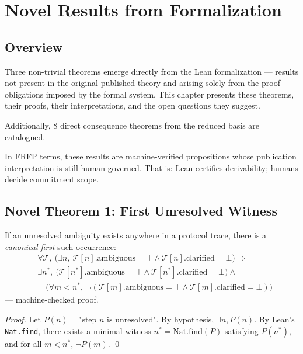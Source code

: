 \section{Novel Results from Formalization}
\label{ch:results}

\subsection{Overview}

Three non-trivial theorems emerge directly from the Lean formalization --- results
not present in the original published theory and arising solely from the proof
obligations imposed by the formal system. This chapter presents these theorems,
their proofs, their interpretations, and the open questions they suggest.

Additionally, 8 direct consequence theorems from the reduced basis are catalogued.

In FRFP terms, these results are machine-verified propositions whose publication
interpretation is still human-governed. That is: Lean certifies derivability;
humans decide commitment scope.

\subsection{Novel Theorem 1: First Unresolved Witness}

\begin{theorem}
If an unresolved ambiguity exists anywhere in a protocol trace, there is a
\emph{canonical first} such occurrence:
\begin{align*}
  &\forall \mathcal{T},\
  \Big(\exists n,\
  \mathcal{T}[n].\mathrm{ambiguous} = \top
  \wedge \mathcal{T}[n].\mathrm{clarified} = \bot\Big)
  \Rightarrow \\
  &\exists n^*,\
  \Big(\mathcal{T}[n^*].\mathrm{ambiguous} = \top
  \wedge \mathcal{T}[n^*].\mathrm{clarified} = \bot\Big)
  \wedge \\
  &\quad \Big(\forall m < n^*,\
  \neg(\mathcal{T}[m].\mathrm{ambiguous} = \top
      \wedge \mathcal{T}[m].\mathrm{clarified} = \bot)\Big)
\end{align*}
--- machine-checked proof.
\end{theorem}
\begin{proof}
Let $P(n) = \text{"step } n \text{ is unresolved"}$. By hypothesis, $\exists n,
P(n)$. By Lean's \texttt{Nat.find}, there exists a minimal witness $n^* =
\mathrm{Nat.find}(P)$ satisfying $P(n^*)$, and for all $m < n^*$, $\neg P(m)$.
\qed
\end{proof}


